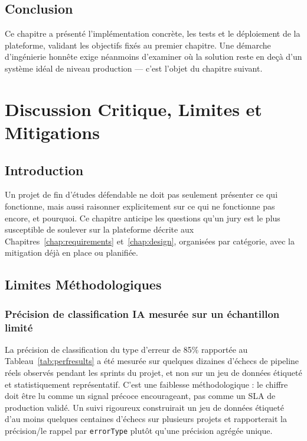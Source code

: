 \documentclass[12pt,a4paper,oneside]{report}
\begin{document}
\section{Conclusion}
Ce chapitre a présenté l'implémentation concrète, les tests et le déploiement de la plateforme, validant les objectifs fixés au premier chapitre. Une démarche d'ingénierie honnête exige néanmoins d'examiner où la solution reste en deçà d'un système idéal de niveau production --- c'est l'objet du chapitre suivant.

\chapter{Discussion Critique, Limites et Mitigations}\label{chap:critical}
\section{Introduction}
Un projet de fin d'études défendable ne doit pas seulement présenter ce qui fonctionne, mais aussi raisonner explicitement sur ce qui ne fonctionne pas encore, et pourquoi. Ce chapitre anticipe les questions qu'un jury est le plus susceptible de soulever sur la plateforme décrite aux Chapitres~\ref{chap:requirements} et~\ref{chap:design}, organisées par catégorie, avec la mitigation déjà en place ou planifiée.

\section{Limites Méthodologiques}
\subsection{Précision de classification IA mesurée sur un échantillon limité}\label{sec:aiaccuracylimit}
La précision de classification du type d'erreur de 85\% rapportée au Tableau~\ref{tab:perfresults} a été mesurée sur quelques dizaines d'échecs de pipeline réels observés pendant les sprints du projet, et non sur un jeu de données étiqueté et statistiquement représentatif. C'est une faiblesse méthodologique : le chiffre doit être lu comme un signal précoce encourageant, pas comme un SLA de production validé. Un suivi rigoureux construirait un jeu de données étiqueté d'au moins quelques centaines d'échecs sur plusieurs projets et rapporterait la précision/le rappel par \texttt{errorType} plutôt qu'une précision agrégée unique.
\end{document}
